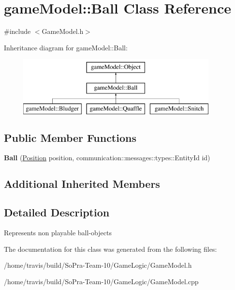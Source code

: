 \hypertarget{classgame_model_1_1_ball}{\section{game\-Model\-:\-:Ball Class Reference}
\label{classgame_model_1_1_ball}
}


{\ttfamily \#include $<$Game\-Model.\-h$>$}

Inheritance diagram for game\-Model\-:\-:Ball\-:\begin{figure}[H]
\begin{center}
\leavevmode
\includegraphics[height=3.000000cm]{classgame_model_1_1_ball}
\end{center}
\end{figure}
\subsection*{Public Member Functions}
\begin{DoxyCompactItemize}
\item 
\hypertarget{classgame_model_1_1_ball_a9f5a9659a7db01cdd3f4855309c40429}{{\bfseries Ball} (\hyperlink{structgame_model_1_1_position}{Position} position, communication\-::messages\-::types\-::\-Entity\-Id id)}\label{classgame_model_1_1_ball_a9f5a9659a7db01cdd3f4855309c40429}

\end{DoxyCompactItemize}
\subsection*{Additional Inherited Members}


\subsection{Detailed Description}
Represents non playable ball-\/objects 

The documentation for this class was generated from the following files\-:\begin{DoxyCompactItemize}
\item 
/home/travis/build/\-So\-Pra-\/\-Team-\/10/\-Game\-Logic/Game\-Model.\-h\item 
/home/travis/build/\-So\-Pra-\/\-Team-\/10/\-Game\-Logic/Game\-Model.\-cpp\end{DoxyCompactItemize}
